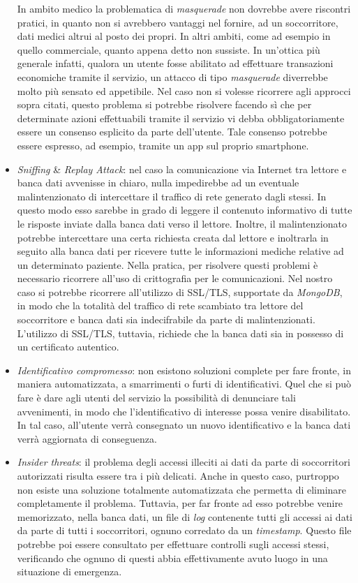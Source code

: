 \documentclass[a4paper,12pt]{report}
\begin{document}
\begin{itemize}
	In ambito medico la problematica di \emph{masquerade} non dovrebbe avere riscontri pratici, in quanto non si avrebbero vantaggi nel fornire, ad un soccorritore, dati medici altrui al posto dei propri. In altri ambiti, come ad esempio in quello commerciale, quanto appena detto non sussiste. In un'ottica più generale infatti, qualora un utente fosse abilitato ad effettuare transazioni economiche tramite il servizio, un attacco di tipo \emph{masquerade} diverrebbe molto più sensato ed appetibile. Nel caso non si volesse ricorrere agli approcci sopra citati, questo problema si potrebbe risolvere facendo sì che per determinate azioni effettuabili tramite il servizio vi debba obbligatoriamente essere un consenso esplicito da parte dell'utente. Tale consenso potrebbe essere espresso, ad esempio, tramite un app sul proprio smartphone. 
	
	\item \emph{Sniffing} \& \emph{Replay Attack}: nel caso la comunicazione via Internet tra lettore e banca dati avvenisse in chiaro, nulla impedirebbe ad un eventuale malintenzionato di intercettare il traffico di rete generato dagli stessi. In questo modo esso sarebbe in grado di leggere il contenuto informativo di tutte le risposte inviate dalla banca dati verso il lettore. Inoltre, il malintenzionato potrebbe intercettare una certa richiesta creata dal lettore e inoltrarla in seguito alla banca dati per ricevere tutte le informazioni mediche relative ad un determinato paziente. Nella pratica, per risolvere questi problemi è necessario ricorrere all'uso di crittografia per le comunicazioni. Nel nostro caso si potrebbe ricorrere all'utilizzo di SSL/TLS, supportate da \emph{MongoDB}, in modo che la totalità del traffico di rete scambiato tra lettore del soccorritore e banca dati sia indecifrabile da parte di malintenzionati. L'utilizzo di SSL/TLS, tuttavia, richiede che la banca dati sia in possesso di un certificato autentico.
	
	\item \emph{Identificativo compromesso}: non esistono soluzioni complete per fare fronte, in maniera automatizzata, a smarrimenti o furti di identificativi. Quel che si può fare è dare agli utenti del servizio la possibilità di denunciare tali avvenimenti, in modo che l'identificativo di interesse possa venire disabilitato. In tal caso, all'utente verrà consegnato un nuovo identificativo e la banca dati verrà aggiornata di conseguenza.
	
	\item \emph{Insider threats}: il problema degli accessi illeciti ai dati da parte di soccorritori autorizzati risulta essere tra i più delicati. Anche in questo caso, purtroppo non esiste una soluzione totalmente automatizzata che permetta di eliminare
	completamente il problema. Tuttavia, per far fronte ad esso potrebbe venire memorizzato, nella banca dati, un file di \emph{log} contenente tutti gli accessi ai dati da parte di tutti i soccorritori, ognuno corredato da un \emph{timestamp}. Questo file potrebbe poi essere consultato per effettuare controlli sugli accessi stessi, verificando  che ognuno di questi abbia effettivamente avuto luogo in una situazione di emergenza.
	

\end{itemize}
\end{document}
